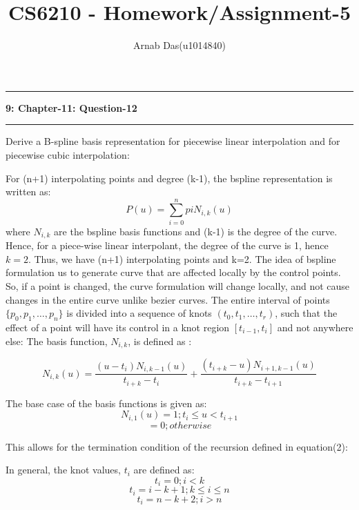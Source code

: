 \documentclass{article}
\title{CS6210 - Homework/Assignment-5}
\author{Arnab Das(u1014840)}
\newcommand\question[2]{\vspace{.25in}\hrule\textbf{#1: #2}\hrule\vspace{.10in}}
\begin{document}
  \maketitle
  \newpage
  \newcommand\NAME{ARNAB DAS}
  \newcommand\UID{uxxxxxxx}
  \newcommand\HWNUM{4}


 \question{9}{Chapter-11: Question-12}
Derive a B-spline basis representation for piecewise linear interpolation and for piecewise cubic interpolation: \newline

For (n+1) interpolating  points and degree (k-1), the bspline representation is written as: \newline
\begin{equation}
  P(u) = \sum_{i=0}^n pi N_{i,k}(u)
\end{equation}
 where $N_{i,k}$ are the bspline basis functions and (k-1) is the degree of the curve. Hence, for a piece-wise linear interpolant, the degree of the curve is 1, hence $k=2$. Thus, we have (n+1) interpolating points and k=2. \newline
The idea of bspline formulation us to  generate curve that are affected locally by the control points. So, if a point is changed, the curve formulation will change locally, and not cause changes in the entire curve unlike bezier curves. The entire interval of points $\{ p_0, p_1, \dots, p_n\}$ is divided into a sequence of knots $(t_0, t_1, \dots, t_r)$, such that the effect of a point will have its control in a knot region $[t_{i-1}, t_i]$ and not anywhere else: \newline
The basis function, $N_{i,k}$, is defined as :\newline

\begin{equation}
   N_{i,k}(u) = \dfrac{(u - t_i) N_{i,k-1}(u)}{t_{i+k} - t_i} + \dfrac{(t_{i+k} - u)N_{i+1,k-1}(u)}{t_{i+k} - t_{i+1}}
\end{equation}

The base case of the basis functions is given as:
\[ N_{i,1}(u) = 1; t_i \leq u < t_{i+1}\]
\[ = 0 ; otherwise\]

This allows for the termination condition of the recursion defined in equation(2): \newline

In general, the knot values, $t_i$ are defined as: \newline
\[ t_i = 0; i < k\]
\[ t_i = i-k+1; k \leq i \leq n\]
\[ t_i = n-k+2; i > n\]
\end{document}
